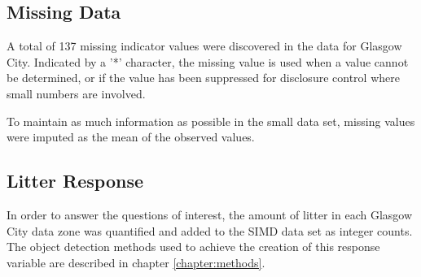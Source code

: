 \documentclass{thesis}
\begin{document}
\subsection*{Missing Data}

A total of 137 missing indicator values were discovered in the data for Glasgow City. Indicated by a '*' character, the missing value is used when a value cannot be determined, or if the value has been suppressed for disclosure control where small numbers are involved.

To maintain as much information as possible in the small data set, missing values were imputed as the mean of the observed values.

\subsection*{Litter Response}

In order to answer the questions of interest, the amount of litter in each Glasgow City data zone was quantified and added to the SIMD data set as integer counts. The object detection methods used to achieve the creation of this response variable are  described in chapter \ref{chapter:methods}.

\end{document}
